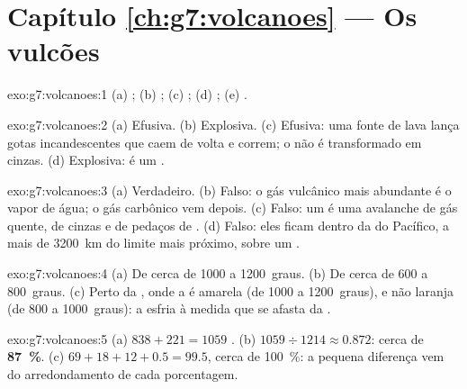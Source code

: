\section*{Capítulo \ref{ch:g7:volcanoes} --- Os vulcões}

\begin{solution}{exo:g7:volcanoes:1}
(a) ; (b) ; (c) ; (d) ; (e) .
\end{solution}

\begin{solution}{exo:g7:volcanoes:2}
(a) Efusiva. (b) Explosiva. (c) Efusiva: uma fonte de lava lança gotas
incandescentes que caem de volta e correm; o  não é transformado em
cinzas. (d) Explosiva: é um .
\end{solution}

\begin{solution}{exo:g7:volcanoes:3}
(a) Verdadeiro. (b) Falso: o gás vulcânico mais abundante é o vapor de
água; o gás carbônico vem depois. (c) Falso: um  é uma
avalanche de gás quente, de cinzas e de pedaços de . (d) Falso: eles
ficam dentro da  do Pacífico, a mais de 3200~km do limite mais
próximo, sobre um .
\end{solution}

\begin{solution}{exo:g7:volcanoes:4}
(a) De cerca de 1000 a 1200~graus. (b) De cerca de 600 a 800~graus.
(c) Perto da , onde a  é amarela (de 1000 a 1200~graus), e não
laranja (de 800 a 1000~graus): a  esfria à medida que se afasta da
.
\end{solution}

\begin{solution}{exo:g7:volcanoes:5}
(a) $838 + 221 = 1059$ . (b) $1059 \div 1214 \approx 0.872$: cerca
de \textbf{87~\%}. (c) $69 + 18 + 12 + 0.5 = 99.5$, cerca de 100~\%: a
pequena diferença vem do arredondamento de cada porcentagem.
\end{solution}

